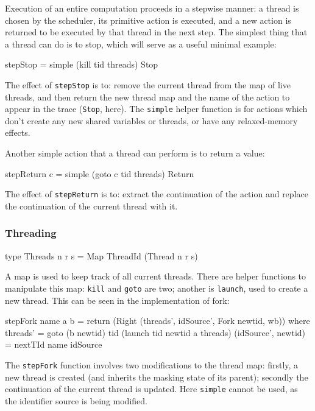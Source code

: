 Execution of an entire computation proceeds in a stepwise manner: a
thread is chosen by the scheduler, its primitive action is executed,
and a new action is returned to be executed by that thread in the next
step. The simplest thing that a thread can do is to stop, which will
serve as a useful minimal example:

\begin{haskellcode}
stepStop = simple (kill tid threads) Stop
\end{haskellcode}

The effect of \verb|stepStop| is to: remove the current thread from
the map of live threads, and then return the new thread map and the
name of the action to appear in the trace (\verb|Stop|, here). The
\verb|simple| helper function is for actions which don't create any
new shared variables or threads, or have any relaxed-memory effects.

Another simple action that a thread can perform is to return a value:

\begin{haskellcode}
stepReturn c = simple (goto c tid threads) Return
\end{haskellcode}

The effect of \verb|stepReturn| is to: extract the continuation of the
action and replace the continuation of the current thread with it.

\subsubsection{Threading}
\label{sec:execution-stepwise-threading}

\begin{haskellcode}
type Threads n r s = Map ThreadId (Thread n r s)
\end{haskellcode}

A map is used to keep track of all current threads. There are helper
functions to manipulate this map: \verb|kill| and \verb|goto| are two;
another is \verb|launch|, used to create a new thread. This can be
seen in the implementation of fork:

\begin{haskellcode}
stepFork name a b = return (Right (threads', idSource', Fork newtid, wb)) where
  threads' = goto (b newtid) tid (launch tid newtid a threads)
  (idSource', newtid) = nextTId name idSource
\end{haskellcode}

The \verb|stepFork| function involves two modifications to the thread
map: firstly, a new thread is created (and inherits the masking state
of its parent); secondly the continuation of the current thread is
updated. Here \verb|simple| cannot be used, as the identifier source
is being modified.

